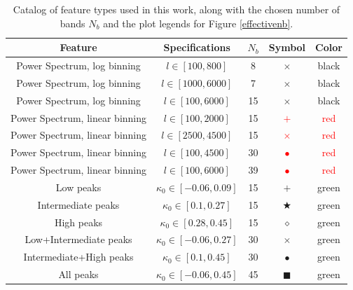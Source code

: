 \documentclass[reprint,aps,prd,superscriptaddress,showkeys,showpacs]{revtex4-1}
\begin{document}
\begin{table}
\begin{center}
\begin{tabular}{ccccc}
\toprule
\textbf{Feature} &  \textbf{Specifications} & $N_b$ &  \textbf{Symbol} & \textbf{Color} \\ \hline \hline
\midrule
Power Spectrum, log binning  & $l \in [100,800] $ & 8 & $\times$ & black  \\ 
Power Spectrum, log binning  & $l \in [1000,6000] $ & 7 & $\times$ & black  \\ 
Power Spectrum, log binning  & $l \in [100,6000] $ & 15 & $\times$ & black  \\
Power Spectrum, linear binning  & $l \in [100,2000] $ & 15 & \textcolor{red}{$+$} & \textcolor{red}{red}  \\ 
Power Spectrum, linear binning  & $l \in [2500,4500] $ & 15 & \textcolor{red}{$\times$} & \textcolor{red}{red}  \\
Power Spectrum, linear binning  & $l \in [100,4500] $ & 30 & \textcolor{red}{$\bullet$} & \textcolor{red}{red}  \\ 
Power Spectrum, linear binning  & $l \in [100,6000] $ & 39 & \textcolor{red}{$\bullet$} & \textcolor{red}{red}  \\ \hline
Low peaks  & $\kappa_0 \in [-0.06,0.09] $ & 15 & \textcolor{OliveGreen}{$+$} & \textcolor{OliveGreen}{green}  \\ 
Intermediate peaks  & $\kappa_0 \in [0.1,0.27] $ & 15 & \textcolor{OliveGreen}{$\bigstar$} & \textcolor{OliveGreen}{green}  \\ 
High peaks  & $\kappa_0 \in [0.28,0.45] $ & 15 & \textcolor{OliveGreen}{$\diamond$} & \textcolor{OliveGreen}{green}  \\
Low+Intermediate peaks  & $\kappa_0 \in [-0.06,0.27] $ & 30 & \textcolor{OliveGreen}{$\times$} & \textcolor{OliveGreen}{green}  \\
Intermediate+High peaks  & $\kappa_0 \in [0.1,0.45] $ & 30 & \textcolor{OliveGreen}{$\bullet$} & \textcolor{OliveGreen}{green}  \\
All peaks  & $\kappa_0 \in [-0.06,0.45] $ & 45 & \textcolor{OliveGreen}{$\blacksquare$} & \textcolor{OliveGreen}{green}  \\ \hline
\bottomrule
\end{tabular}
\end{center}
\caption{Catalog of feature types used in this work, along with the chosen number of bands $N_b$ and the plot legends for Figure \ref{effectivenb}.}
\label{featuretable}
\end{table}
\end{document}
